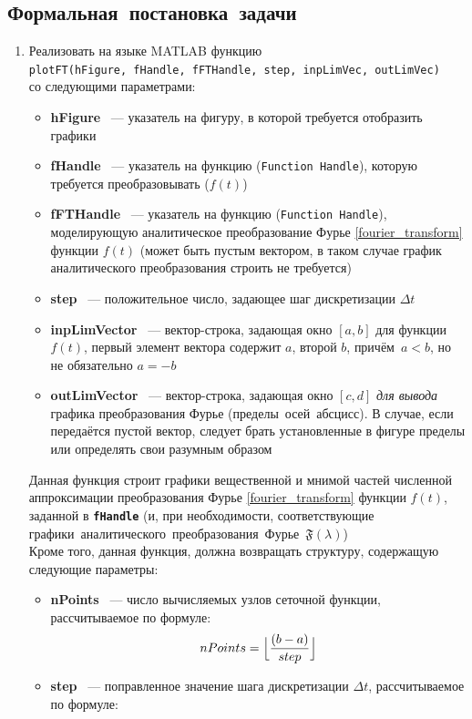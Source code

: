 \documentclass[11pt, oneside, final]{article}
\numberwithin{equation}{section}
\newcommand \bitem[1][]{
\item \textbf{#1}}
\newcommand \four[1][\lambda]{\mathfrak{F}(#1)}
\begin{document}
    \subsection{Формальная~постановка~задачи} 
    \begin{enumerate}
        \item Реализовать на языке MATLAB функцию \\\texttt{plotFT(hFigure,~fHandle,~fFTHandle,~step,~inpLimVec,~outLimVec)} \\со следующими параметрами: 
        \begin{itemize}
            \bitem[hFigure] ~--- указатель на фигуру, в которой требуется отобразить графики \bitem[fHandle] ~--- указатель на функцию (\texttt{Function Handle}), которую требуется преобразовывать (\(f(t)\)) \bitem[fFTHandle] ~--- указатель на функцию (\texttt{Function Handle}), моделирующую аналитическое преобразование Фурье \eqref{fourier_transform} функции \(f(t)\) (может быть пустым вектором, в таком случае график аналитического преобразования строить не требуется) \bitem[step] ~--- положительное число, задающее шаг дискретизации \(\Delta t\) \bitem[inpLimVector] ~--- вектор-строка, задающая окно \([a, b]\) для функции \(f(t)\), первый элемент вектора содержит \(a\), второй \(b\), причём~\(a < b\), но не обязательно \(a = -b\) \bitem[outLimVector] ~--- вектор-строка, задающая окно \([c, d]\) \textit{для вывода} графика преобразования Фурье (пределы~осей~абсцисс). В случае, если передаётся пустой вектор, следует брать установленные в фигуре пределы или определять свои разумным образом 
        \end{itemize}
        Данная функция строит графики вещественной и мнимой частей численной аппроксимации преобразования Фурье \eqref{fourier_transform} функции \(f(t)\), заданной в \textbf{\texttt{fHandle}} (и, при необходимости, соответствующие графики~аналитического~преобразования~Фурье~\(\four\)) \\
        Кроме того, данная функция, должна возвращать структуру, содержащую следующие параметры: 
        \begin{itemize}
            \bitem[nPoints] ~--- число вычисляемых узлов сеточной функции, рассчитываемое по формуле:
            \begin{equation}
            \label{eq:npoints}
                nPoints = \Bigl\lfloor {\dfrac{(b - a)}{step}}\Bigr\rfloor 
            \end{equation}
            \bitem[step] ~--- поправленное значение шага дискретизации \(\Delta t\), рассчитываемое по формуле:

\end{itemize}
\end{enumerate}
\end{document}
